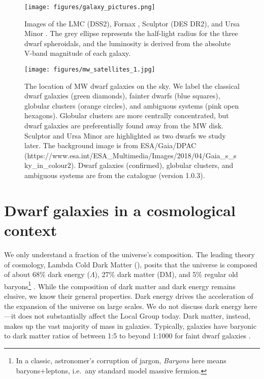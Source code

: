 \begin{figure}
\centering
\texttt{[image: figures/galaxy\_pictures.png]}
\caption[Images of dwarf galaxies]{Images of the LMC (DSS2), Fornax
\citep[DES DR2,][]{abbott+2021}, Sculptor (DES DR2), and Ursa Minor
\citep[UNWISE,][with \textit{Gaia} point sources
over-plotted]{lang2014, meisner+lang+schlegel2017, meisner+lang+schlegel2017a}.
The grey ellipse represents the half-light radius for the three dwarf
spheroidals, and the luminosity is derived from the absolute V-band
magnitude of each galaxy.}\label{fig:galaxy_images}
\end{figure}

\begin{figure}
\centering
\texttt{[image: figures/mw\_satellites\_1.jpg]}
\caption[The on-sky distribution of Milky Way satellites]{The location
of MW dwarf galaxies on the sky. We label the classical dwarf galaxies
(green diamonds), fainter dwarfs (blue squares), globular clusters
(orange circles), and ambiguous systems (pink open hexagons). Globular
clusters are more centrally concentrated, but dwarf galaxies are
preferentially found away from the MW disk. Sculptor and Ursa Minor are
highlighted as two dwarfs we study later. The background image is from
ESA/Gaia/DPAC
(https://www.esa.int/ESA\_Multimedia/Images/2018/04/Gaia\_s\_sky\_in\_colour2).
Dwarf galaxies (confirmed), globular clusters, and ambiguous systems are
from the \citet{pace2024} catalogue (version
1.0.3).}\label{fig:mw_satellite_system}
\end{figure}

\section{Dwarf galaxies in a cosmological
context}\label{dwarf-galaxies-in-a-cosmological-context}

We only understand a fraction of the universe's composition. The leading
theory of cosmology, Lambda Cold Dark Matter (\LCDM{}), posits that the
universe is composed of about 68\% dark energy (\(\Lambda\)), 27\% dark
matter (DM), and 5\% regular old baryons\footnote{In a classic,
  astronomer's corruption of jargon, \emph{Baryons} here means
  baryons+leptons, i.e.~any standard model massive fermion.}
\citep{planckcollaboration+2020}. While the composition of dark matter
and dark energy remains elusive, we know their general properties. Dark
energy drives the acceleration of the expansion of the universe on large
scales. We do not discuss dark energy here---it does not substantially
affect the Local Group today. Dark matter, instead, makes up the vast
majority of mass in galaxies. Typically, galaxies have baryonic to dark
matter ratios of between 1:5 to beyond 1:1000 for faint dwarf galaxies
\citep[e.g.,][]{hayashi+2023}.

